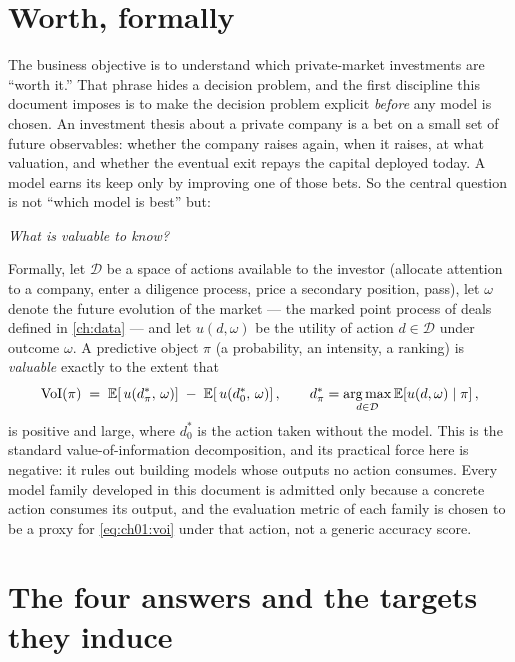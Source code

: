 
\section{Worth, formally}\label{ch01:sec:worth}

The business objective is to understand which private-market investments are
``worth it.'' That phrase hides a decision problem, and the first discipline
this document imposes is to make the decision problem explicit
\emph{before} any model is chosen. An investment thesis about a private
company is a bet on a small set of future observables: whether the company
raises again, when it raises, at what valuation, and whether the eventual
exit repays the capital deployed today. A model earns its keep only by
improving one of those bets. So the central question is not ``which model is
best'' but:

\begin{center}
\emph{What is valuable to know?}
\end{center}

Formally, let $\mathcal{D}$ be a space of actions available to the investor
(allocate attention to a company, enter a diligence process, price a
secondary position, pass), let $\omega$ denote the future evolution of the
market --- the marked point process of deals defined in \cref{ch:data} ---
and let $u(d,\omega)$ be the utility of action $d\in\mathcal{D}$ under
outcome $\omega$. A predictive object $\pi$ (a probability, an intensity, a
ranking) is \emph{valuable} exactly to the extent that
\begin{equation}\label{eq:ch01:voi}
\mathrm{VoI}(\pi)
 \;=\;
 \E\!\left[\, u\!\left(d^{*}_{\pi},\,\omega\right) \right]
 \;-\;
 \E\!\left[\, u\!\left(d^{*}_{0},\,\omega\right) \right],
 \qquad
 d^{*}_{\pi} = \argmax_{d\in\mathcal{D}} \E\!\left[u(d,\omega)\st \pi\right],
\end{equation}
is positive and large, where $d^{*}_{0}$ is the action taken without the
model. This is the standard value-of-information decomposition, and its
practical force here is negative: it rules out building models whose outputs
no action consumes. Every model family developed in this document is
admitted only because a concrete action consumes its output, and the
evaluation metric of each family is chosen to be a proxy for
\cref{eq:ch01:voi} under that action, not a generic accuracy score.

\section{The four answers and the targets they induce}\label{ch01:sec:targets}

